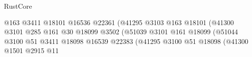 \begin{lexlean}{RustCore}
\begin{coremodule}
                                                                @163
                                                                @3411
                                                                @18101
                                                                @16536
                                                                @22361
                                                                (@41295
                                                                  @3103
                                                                  @163
                                                                  @18101
                                                                  (@41300
                                                                    @3101
                                                                    @285
                                                                    @161
                                                                    @30
                                                                    @18099
                                                                    @3502
                                                                    (@51039
                                                                      @3101
                                                                      @161
                                                                      @18099
                                                                      (@51044
                                                                        @3100
                                                                        @51
                                                                        @3411
                                                                        @18098
                                                                        @16539
                                                                        @22383
                                                                        (@41295
                                                                          @3100
                                                                          @51
                                                                          @18098
                                                                          (@41300
                                                                            @1501
                                                                            @2915
                                                                            @11

\end{coremodule}
\end{lexlean}
